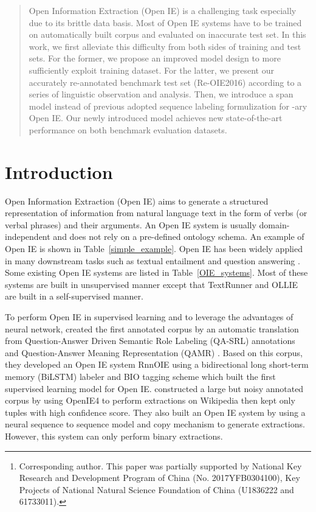 \documentclass[letterpaper]{article} \usepackage{aaai20}  \usepackage{times}  \usepackage{helvet} \usepackage{courier}  \usepackage[hyphens]{url}  \urlstyle{rm} \def\UrlFont{\rm}  \usepackage{graphicx}  \frenchspacing  \setlength{\pdfpagewidth}{8.5in}  \setlength{\pdfpageheight}{11in}
\author{Junlang Zhan\textsuperscript{\rm 1,\rm 2,\rm 3}, Hai Zhao\textsuperscript{\rm 1,\rm 2,\rm 3,}\thanks{Corresponding author. This paper was partially supported by National Key Research and Development Program of China (No. 2017YFB0304100), 
Key Projects of National Natural Science Foundation of China (U1836222 and 61733011).}\\ \textsuperscript{\rm 1}Department of Computer Science and Engineering, Shanghai Jiao Tong University\\ \textsuperscript{\rm 2} Key Laboratory of Shanghai Education Commission for Intelligent Interaction \\
and Cognitive Engineering, Shanghai Jiao Tong University, Shanghai, China \\
\textsuperscript{\rm 3} MoE Key Lab of Artificial Intelligence, AI Institute, Shanghai Jiao Tong University \\
longmr.zhan@sjtu.edu.cn, zhaohai@cs.sjtu.edu.cn }
\begin{document}
\maketitle

\begin{abstract}
Open Information Extraction (Open IE) is a challenging task especially due to its brittle data basis. Most of Open IE systems have to be trained on automatically built corpus and evaluated on inaccurate test set. In this work, we first alleviate this difficulty from both sides of training and test sets. For the former, we propose an improved model design to more sufficiently exploit training dataset. For the latter, we present our accurately re-annotated benchmark test set (Re-OIE2016) according to a series of linguistic observation and analysis. Then, we introduce a span model instead of previous adopted sequence labeling formulization for -ary Open IE. Our newly introduced model achieves new state-of-the-art performance on both benchmark evaluation datasets.
\end{abstract}

\section{Introduction}
Open Information Extraction (Open IE) aims to generate a structured representation of information from natural language text in the form of verbs (or verbal phrases) and their arguments. An Open IE system is usually domain-independent and does not rely on a pre-defined ontology schema. An example of Open IE is shown in Table~\ref{simple_example}. Open IE has been widely applied in many downstream tasks such as textual entailment and question answering \cite{Fader2014OpenQA}. Some existing Open IE systems are listed in Table~\ref{OIE_systems}. Most of these systems are built in unsupervised manner except that TextRunner and OLLIE are built in a self-supervised manner.

To perform Open IE in supervised learning and to leverage the advantages of neural network, \cite{Stanovsky2018SupervisedOI} created the first annotated corpus by an automatic translation from Question-Answer Driven Semantic Role Labeling (QA-SRL) annotations \cite{He2015QuestionAnswerDS} and Question-Answer Meaning Representation (QAMR) \cite{Michael2018CrowdsourcingQM}. Based on this corpus, they developed an Open IE system RnnOIE using a bidirectional long short-term memory (BiLSTM) labeler and BIO tagging scheme which built the first supervised learning model for Open IE. \cite{Cui2018NeuralOI} constructed a large but noisy annotated corpus by using OpenIE4 to perform extractions on Wikipedia then kept only tuples with high confidence score. They also built an Open IE system by using a neural sequence to sequence model and copy mechanism to generate extractions. However, this system can only perform binary extractions.
\end{document}
